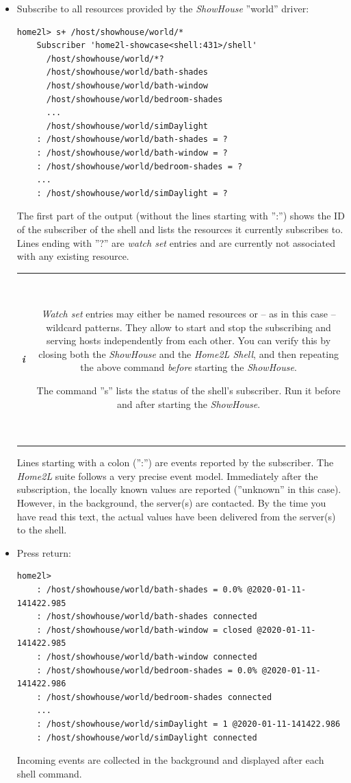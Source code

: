 \documentclass[12pt,english,parskip=half,headheight=19pt]{scrreprt}
\newcommand{\infobox}[1]{
  \par
  \medskip
  \hfill
  \setlength\arrayrulewidth{1pt}
  \begin{tabular}[t]{c|c|}
    \parbox{1.8em}{\hfill\textit{\Huge\textbf{i}\,}}
    &
    \,\parbox{0.89\linewidth}{\setlength{\parskip}{0.5em} \small #1}\,
  \end{tabular}
  \medskip
  \par
}
\begin{document}
\begin{itemize}[$\blacktriangleright$]

\item
  Subscribe to all resources provided by the \textit{ShowHouse} ''world'' driver:
  \begin{lstlisting}[language=home2l]
    home2l> s+ /host/showhouse/world/*
    Subscriber 'home2l-showcase<shell:431>/shell'
      /host/showhouse/world/*?
      /host/showhouse/world/bath-shades
      /host/showhouse/world/bath-window
      /host/showhouse/world/bedroom-shades
      ...
      /host/showhouse/world/simDaylight
    : /host/showhouse/world/bath-shades = ?
    : /host/showhouse/world/bath-window = ?
    : /host/showhouse/world/bedroom-shades = ?
    ...
    : /host/showhouse/world/simDaylight = ?
  \end{lstlisting}
  The first part of the output (without the lines starting with '':'')
  shows the ID of the subscriber of the shell and lists the resources it
  currently subscribes to. Lines ending with ''?'' are \textit{watch set}
  entries and are currently not associated with any existing resource.

  \infobox{
    \textit{Watch set} entries may either be named resources or -- as in this case -- wildcard
    patterns. They allow to start and stop the subscribing and serving hosts independently
    from each other. You can verify this by closing both the \textit{ShowHouse} and the \textit{Home2L Shell},
    and then repeating the above command \textit{before} starting the \textit{ShowHouse}.

    The command ''s'' lists the status of the shell's subscriber. Run it before and after starting
    the \textit{ShowHouse}.
  }

  Lines starting with a colon ('':'') are events reported by the
  subscriber. The \textit{Home2L} suite follows a very precise event model.
  Immediately after the subscription, the locally known values are
  reported (''unknown'' in this case). However, in the background,
  the server(s) are contacted. By the time you have read this text,
  the actual values have been delivered from the server(s) to the shell.

\item
  Press return:
  \begin{lstlisting}[language=home2l]
    home2l>
    : /host/showhouse/world/bath-shades = 0.0% @2020-01-11-141422.985
    : /host/showhouse/world/bath-shades connected
    : /host/showhouse/world/bath-window = closed @2020-01-11-141422.985
    : /host/showhouse/world/bath-window connected
    : /host/showhouse/world/bedroom-shades = 0.0% @2020-01-11-141422.986
    : /host/showhouse/world/bedroom-shades connected
    ...
    : /host/showhouse/world/simDaylight = 1 @2020-01-11-141422.986
    : /host/showhouse/world/simDaylight connected
  \end{lstlisting}
  Incoming events are collected in the background and displayed after each shell command.


\end{itemize}
\end{document}
